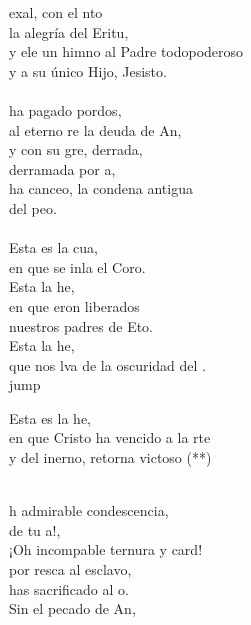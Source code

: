 \begin{cancion}
	exal, con el nto \\
	la alegría del Eritu, \\
	y ele un himno al Padre todopoderoso\\
	y a su único Hijo, Jesisto.\\
	\jump\\
	 ha pagado pordos,\\
	al eterno re la deuda de An,\\
	y con su gre, derrada,\\
	derramada por a,\\
	ha canceo, la condena antigua\\
	del peo.\\
	\jump\\
	Esta es la cua,\\
	en que se inla el Coro.\\
	Esta  la he,\\
	en que eron liberados\\
	nuestros padres de Eto.\\
	Esta  la he,\\
	que nos lva de la oscuridad del .\\jump\\
	\begin{chorus}%
	Esta es la he,\\
	en que Cristo ha vencido a la rte\\
	y del inerno, retorna victoso (**)\\
	\end{chorus}%
	\jump\\
	h admirable condescencia,\\
	de tu a!,\\
	¡Oh incompable ternura y card!\\
	por resca al esclavo,\\
	has sacrificado al o.\\
	Sin el pecado de An,\\

\end{cancion}
